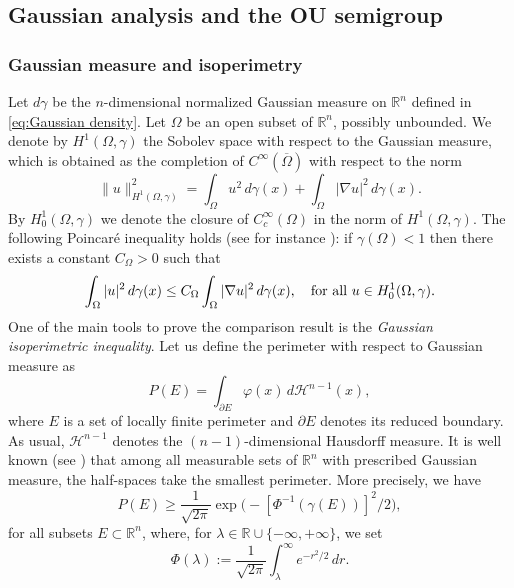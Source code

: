 \documentclass[a4paper,10pt,reqno]{amsart}
\newcommand{\R}{\mathbb{R}}
\numberwithin{equation}{section}
\begin{document}
\subsection{Gaussian analysis and the OU semigroup}

\subsubsection{Gaussian measure and isoperimetry}

Let $d\gamma$ be the $n$-dimensional normalized Gaussian measure on $\mathbb{R}^{n}$
defined in \eqref{eq:Gaussian density}. Let $\Omega$ be an open subset of $\R^n$, possibly unbounded.
We denote by $H^{1}(\Omega,\gamma)$ the Sobolev space
with respect to the Gaussian measure,
which is obtained as the completion of $C^{\infty}(\overline{\Omega})$ with respect to the norm
$$\|u\|_{H^{1}(\Omega,\gamma)}^2=\int_{\Omega}
u^{2}\,d\gamma(x)+\int_{\Omega}|\nabla u|^{2}\,d\gamma(x).$$
By $H^{1}_{0}(\Omega,\gamma)$ we denote
the closure of $C_c^{\infty}(\Omega)$ in the norm of $H^{1}(\Omega,\gamma)$.
The following Poincar\'{e} inequality holds (see for instance \cite{Eh2}):
if $\gamma(\Omega)<1$ then there exists a constant $C_\Omega>0$ such that
\begin{equation}
\int_{\Omega}| u|^{2}\,d\gamma(x)\leq C_{\Omega}\int_{\Omega}
|\nabla u|^{2}\,d\gamma(x),\quad\hbox{for all}~u\in H_{0}^{1}(\Omega,\gamma).
\label{Poincare}
\end{equation}
One of the main tools to prove the comparison result is the \emph{Gaussian
isoperimetric inequality}. Let us define the
perimeter with respect to Gaussian measure as
$$P(E)=\int_{\partial E}\varphi(x)\,d\mathcal{H}^{n-1}(x),$$
where $E$ is a set of locally finite perimeter and $\partial E$ denotes its reduced boundary. As usual, $\mathcal{H}^{n-1}$ denotes the
$(n-1)$-dimensional Hausdorff measure. It is well known (see \cite{Bo})
that among all measurable sets of $\mathbb{R}^{n}$ with prescribed Gaussian
measure, the half-spaces take the smallest perimeter. More precisely, we have
\begin{equation}
P(E)\geq\frac{1}{\sqrt{2\pi}}\exp\big(-[\Phi^{-1}(\gamma(E))]^2/2\big),
\label{dis isop}
\end{equation}
for all subsets $E\subset\mathbb{R}^{n}$, where, for $\lambda\in\mathbb{R}\cup\{-\infty,+\infty\}$, we set
\begin{equation}\label{Phi}
\Phi(\lambda):=\frac{1}{\sqrt{2\pi}}\int_{\lambda}^{\infty}e^{-r^2/2}\,dr.
\end{equation}
\end{document}
